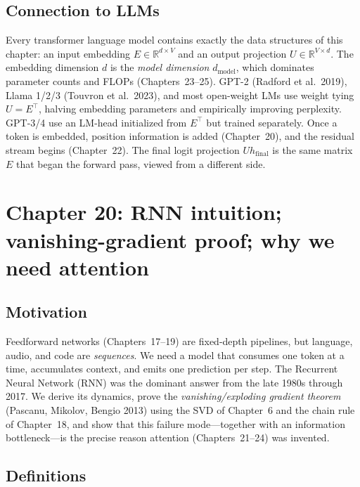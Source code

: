 \documentclass[11pt]{article}
\theoremstyle{remark}
\begin{document}
\subsection*{Connection to LLMs}

Every transformer language model contains exactly the data structures of this chapter: an input embedding $E\in\mathbb{R}^{d\times V}$ and an output projection $U\in\mathbb{R}^{V\times d}$. The embedding dimension $d$ is the \emph{model dimension} $d_{\mathrm{model}}$, which dominates parameter counts and FLOPs (Chapters~23--25). GPT-2 (Radford et al.\ 2019), Llama 1/2/3 (Touvron et al.\ 2023), and most open-weight LMs use weight tying $U=E^\top$, halving embedding parameters and empirically improving perplexity. GPT-3/4 use an LM-head initialized from $E^\top$ but trained separately. Once a token is embedded, position information is added (Chapter~20), and the residual stream begins (Chapter~22). The final logit projection $Uh_{\text{final}}$ is the same matrix $E$ that began the forward pass, viewed from a different side.


\section*{Chapter 20: RNN intuition; vanishing-gradient proof; why we need attention}

\subsection*{Motivation}

Feedforward networks (Chapters~17--19) are fixed-depth pipelines, but
language, audio, and code are \emph{sequences}. We need a model that
consumes one token at a time, accumulates context, and emits one prediction
per step. The Recurrent Neural Network (RNN) was the dominant answer
from the late 1980s through 2017. We derive its dynamics, prove the
\emph{vanishing/exploding gradient theorem} (Pascanu, Mikolov, Bengio
2013) using the SVD of Chapter~6 and the chain rule of Chapter~18, and
show that this failure mode---together with an information bottleneck---is
the precise reason attention (Chapters~21--24) was invented.

\subsection*{Definitions}
\end{document}
